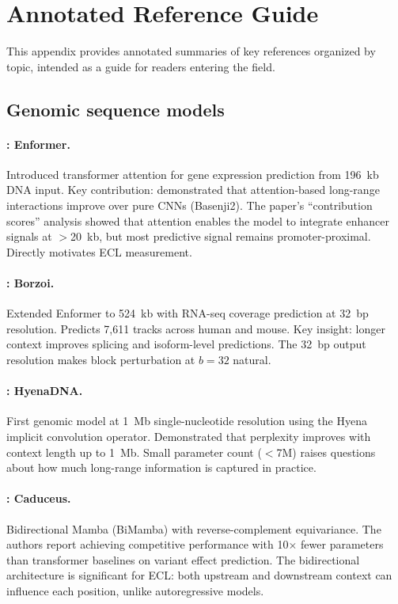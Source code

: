 \section{Annotated Reference Guide}\label{app:references}

This appendix provides annotated summaries of key references organized by topic, intended as a guide for readers entering the field.

\subsection{Genomic sequence models}

\paragraph{\citet{Avsec2021Enformer}: Enformer.}
Introduced transformer attention for gene expression prediction from 196~kb DNA input. Key contribution: demonstrated that attention-based long-range interactions improve over pure CNNs (Basenji2). The paper's ``contribution scores'' analysis showed that attention enables the model to integrate enhancer signals at $>$20~kb, but most predictive signal remains promoter-proximal. Directly motivates ECL measurement.

\paragraph{\citet{Linder2025Borzoi}: Borzoi.}
Extended Enformer to 524~kb with RNA-seq coverage prediction at 32~bp resolution. Predicts 7,611 tracks across human and mouse. Key insight: longer context improves splicing and isoform-level predictions. The 32~bp output resolution makes block perturbation at $b=32$ natural.

\paragraph{\citet{Nguyen2023HyenaDNA}: HyenaDNA.}
First genomic model at 1~Mb single-nucleotide resolution using the Hyena implicit convolution operator. Demonstrated that perplexity improves with context length up to 1~Mb. Small parameter count ($<$7M) raises questions about how much long-range information is captured in practice.

\paragraph{\citet{Schiff2024Caduceus}: Caduceus.}
Bidirectional Mamba (BiMamba) with reverse-complement equivariance. The authors report achieving competitive performance with 10$\times$ fewer parameters than transformer baselines on variant effect prediction. The bidirectional architecture is significant for ECL: both upstream and downstream context can influence each position, unlike autoregressive models.

